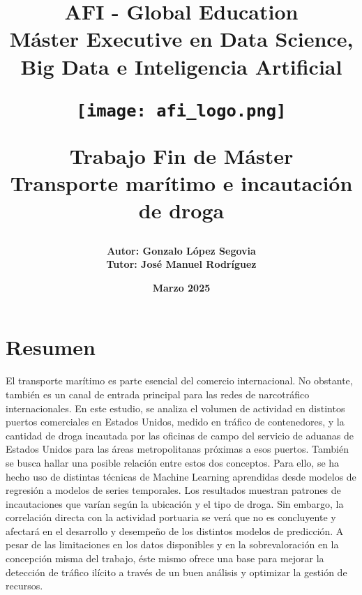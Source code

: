 \documentclass[12pt]{article}
\title{\bf AFI - Global Education\\
\vspace{3cm}
Máster Executive en Data Science, Big Data e Inteligencia Artificial\\
\vspace{2cm}
\begin{center}
	\hspace*{0cm}
	\texttt{[image: afi\_logo.png]} \\
\end{center}

\vspace{2cm}
Trabajo Fin de Máster\\
\vspace{1cm}
Transporte marítimo e incautación de droga
}
\author{
		\bf Autor: Gonzalo López Segovia \\
		\bf Tutor: José Manuel Rodríguez
	}
\date{\bf Marzo 2025}
\begin{document}
	

	

\maketitle

\newpage

\tableofcontents

\newpage

\listoffigures

\newpage

\listoftables

\newpage

\section{\label{resumen}Resumen}
El transporte marítimo es parte esencial del comercio internacional. No obstante, también es un canal de entrada principal para las redes de narcotráfico internacionales. En este estudio, se analiza el volumen de actividad en distintos puertos comerciales en Estados Unidos, medido en tráfico de contenedores, y la cantidad de droga incautada por las oficinas de campo del servicio de aduanas de Estados Unidos para las áreas metropolitanas próximas a esos puertos. También se busca hallar una posible relación entre estos dos conceptos. Para ello, se ha hecho uso de distintas técnicas de Machine Learning aprendidas desde modelos de regresión a modelos de series temporales. Los resultados muestran patrones de incautaciones que varían según la ubicación y el tipo de droga. Sin embargo, la correlación directa con la actividad portuaria se verá que no es concluyente y afectará en el desarrollo y desempeño de los distintos modelos de predicción. A pesar de las limitaciones en los datos disponibles y en la sobrevaloración en la concepción misma del trabajo, éste mismo ofrece una base para mejorar la detección de tráfico ilícito a través de un buen análisis y optimizar la gestión de recursos.
\end{document}
